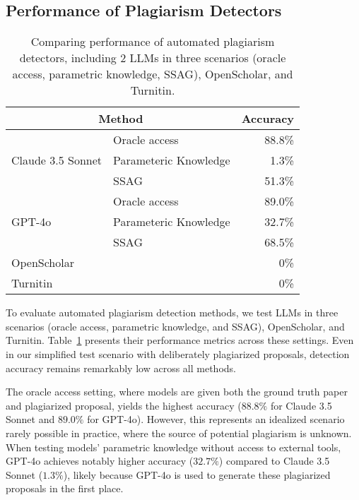 \subsection{Performance of Plagiarism Detectors}
\label{subsec:automated-plag-exp-results}

\begin{table}[t]
    \centering
    \small
    \renewcommand{\arraystretch}{1.3}
    \begin{tabular*}{\columnwidth}{@{\extracolsep{\fill}} llr}
        \toprule
        \multicolumn{2}{c}{\textbf{Method}} & \multicolumn{1}{l}{\textbf{Accuracy}} \\
        \midrule
        \multirow{3}{*}{Claude 3.5 Sonnet} & Oracle access & 88.8\% \\
         & Parameteric Knowledge & 1.3\% \\
         & SSAG & 51.3\% \\
        \midrule
        \multirow{3}{*}{GPT-4o} & Oracle access & 89.0\% \\
         & Parameteric Knowledge & 32.7\% \\
         & SSAG & 68.5\% \\
        \midrule
        \multicolumn{2}{l}{OpenScholar} & 0\% \\
        \midrule
        \multicolumn{2}{l}{Turnitin} & 0\% \\
        \bottomrule
    \end{tabular*}
    \caption{Comparing performance of automated plagiarism detectors, including $2$ LLMs in three scenarios (oracle access, parametric knowledge, SSAG), OpenScholar, and Turnitin.}
    \label{tab:model-comparison}
\end{table}

To evaluate automated plagiarism detection methods, we test LLMs in three scenarios (oracle access, parametric knowledge, and SSAG), OpenScholar, and Turnitin. Table~\ref{tab:model-comparison} presents their performance metrics across these settings. Even in our simplified test scenario with deliberately plagiarized proposals, detection accuracy remains remarkably low across all methods.

The oracle access setting, 
where models are given both 
the ground truth paper and plagiarized proposal, 
yields the highest accuracy ($88.8\%$ for Claude 3.5 Sonnet and $89.0\%$ for GPT-4o). 
However, this represents an idealized scenario rarely possible in practice, 
where the source of potential plagiarism is unknown. 
When testing models' parametric knowledge 
without access to external tools, 
GPT-4o achieves notably higher accuracy ($32.7\%$) 
compared to Claude 3.5 Sonnet ($1.3\%$), 
likely because GPT-4o is used to generate these plagiarized proposals in the first place.

